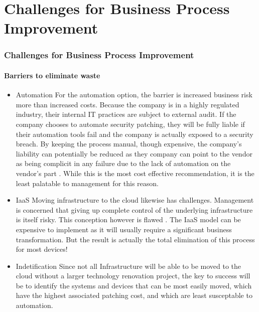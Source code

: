 \section{Challenges for Business Process Improvement}
\begin{frame}
  \frametitle{Challenges for Business Process Improvement}
  \framesubtitle{Barriers to eliminate waste}
  \begin{itemize}
    \item <1-> Automation
       {\scriptsize{For the automation option, the barrier is increased business risk more than increased costs. Because the company is in a highly regulated industry, their internal IT practices are subject to external audit. If the company chooses to automate security patching, they will be fully liable if their automation tools fail and the company is actually exposed to a security breach. By keeping the process manual, though expensive, the company's liability can potentially be reduced as they company can point to the vendor as being complicit in any failure due to the lack of automation on the vendor's part \parencite{hahnLawEconomicsSoftware2006}. While this is the most cost effective recommendation, it is the least palatable to management for this reason.}}

    \item <2-> IaaS
       {\scriptsize{Moving infrastructure to the cloud likewise has challenges. Management is concerned that giving up complete control of the underlying infrastructure is itself risky. This conception however is flawed \parencite{zhangWeKnewIt2014}. The IaaS model can be expensive to implement as it will usually require a significant business transformation. But the result is actually the total elimination of this process for most devices!}}

    \item <3-> Indetification
       {\scriptsize{Since not all Infrastructure will be able to be moved to the cloud without a larger technology renovation project, the key to success will be to identify the systems and devices that can be most easily moved, which have the highest associated patching cost, and which are least susceptable to automation. }}
\end{itemize}
\end{frame}
